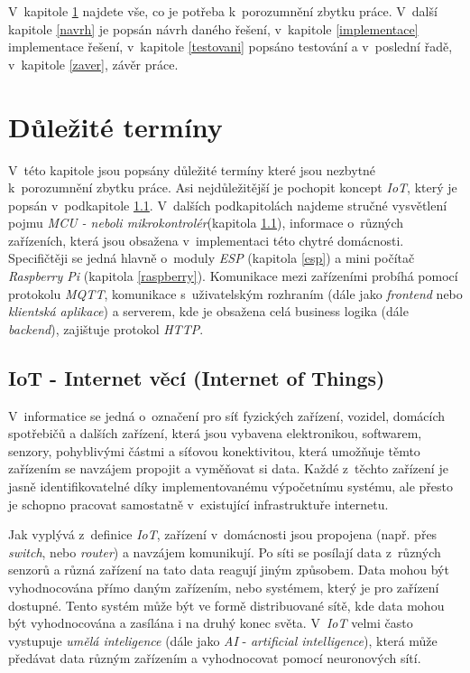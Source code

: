V~kapitole \ref{terminy} najdete vše, co je potřeba k~porozumnění zbytku práce.
V~další kapitole \ref{navrh} je popsán návrh daného řešení, v~kapitole \ref{implementace} implementace řešení, v~kapitole \ref{testovani} popsáno testování a v~poslední řadě, v~kapitole \ref{zaver}, závěr práce.

\chapter{Důležité termíny}
\label{terminy}

V~této kapitole jsou popsány důležité termíny které jsou nezbytné k~porozumnění zbytku práce.
Asi nejdůležitější je pochopit koncept \emph{IoT}, který je popsán v~podkapitole \ref{terminy:iot}.
V~dalších podkapitolách najdeme stručné vysvětlení pojmu \emph{MCU - neboli mikrokontrolér}(kapitola \ref{terminy:iot}), informace o~různých zařízeních, která jsou obsažena v~implementaci této chytré domácnosti.
Specifičtěji se jedná hlavně o~moduly \emph{ESP} (kapitola \ref{esp}) a mini počítač \emph{Raspberry Pi} (kapitola \ref{raspberry}).
Komunikace mezi zařízeními probíhá pomocí protokolu \emph{MQTT}, komunikace s~uživatelským rozhraním (dále jako \emph{frontend} nebo \emph{klientská aplikace}) a serverem, kde je obsažena celá business logika (dále \emph{backend}), zajištuje protokol \emph{HTTP}.

\bigskip

\section{IoT - Internet věcí (Internet of Things)}
\label{terminy:iot}

V~informatice se jedná o~označení pro síť fyzických zařízení, vozidel, domácích spotřebičů a dalších zařízení, která jsou vybavena elektronikou,
softwarem, senzory, pohyblivými částmi a síťovou konektivitou, která umožňuje těmto zařízením se navzájem propojit a vyměňovat si data.
Každé z~těchto zařízení je jasně identifikovatelné díky implementovanému výpočetnímu systému,
ale přesto je schopno pracovat samostatně v~existující infrastruktuře internetu.~\cite{wiki:iot}

Jak vyplývá z~definice \emph{IoT}, zařízení v~domácnosti jsou propojena (např. přes \emph{switch}, nebo \emph{router}) a navzájem komunikují.
Po síti se posílají data z~různých senzorů a různá zařízení na tato data reagují jiným způsobem.
Data mohou být vyhodnocována přímo daným zařízením, nebo systémem, který je pro zařízení dostupné.
Tento systém může být ve formě distribuované sítě, kde data mohou být vyhodnocována a zasílána i na druhý konec světa.
V~\emph{IoT} velmi často vystupuje \emph{umělá inteligence} (dále jako \emph{AI} - \emph{artificial intelligence}), která může předávat data různým zařízením a vyhodnocovat pomocí neuronových sítí.

